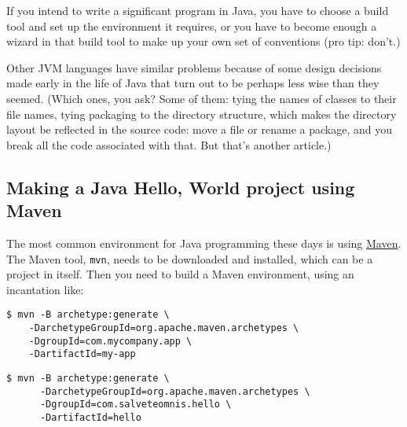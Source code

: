 \documentclass[11pt]{article}
\begin{document}
If you intend to write a significant program in Java, you have to
choose a build tool and set up the environment it requires, or you
have to become enough a wizard in that build tool to make up your own
set of conventions (pro tip: don't.)

Other JVM languages have similar problems because of some design
decisions made early in the life of Java that turn out to be perhaps
less wise than they seemed. (Which ones, you ask? Some of them: tying
the names of classes to their file names, tying packaging to the
directory structure, which makes the directory layout be reflected in
the source code: move a file or rename a package, and you break all
the code associated with that. But that's another article.)

\subsection{Making a Java Hello, World project using Maven}
\label{sec:org16d2471}

The most common environment for Java programming these days is using
\href{https://maven.apache.org/index.html}{Maven}. The Maven tool, \texttt{mvn}, needs to be downloaded and installed,
which can be a project in itself. Then you need to build a Maven
environment, using an incantation like:

\begin{verbatim}
$ mvn -B archetype:generate \
    -DarchetypeGroupId=org.apache.maven.archetypes \
    -DgroupId=com.mycompany.app \
    -DartifactId=my-app

\end{verbatim}
\begin{verbatim}
$ mvn -B archetype:generate \
      -DarchetypeGroupId=org.apache.maven.archetypes \
      -DgroupId=com.salveteomnis.hello \
      -DartifactId=hello
\end{verbatim}
\end{document}
